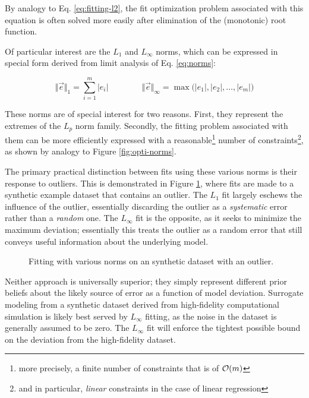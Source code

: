 \noindent
By analogy to Eq. \ref{eq:fitting-l2}, the fit optimization problem associated with this equation is often solved more easily after elimination of the (monotonic) root function.

Of particular interest are the $L_1$ and $L_\infty$ norms, which can be expressed in special form derived from limit analysis of Eq. \ref{eq:norms}:

\begin{equation*}
    \big\Vert \vec{e} \big\Vert _1      = \sum_{i=1}^m |e_i|
    \qquad\qquad
    \big\Vert \vec{e} \big\Vert _\infty = \max\big(|e_1|, |e_2|, \dots, |e_m|\big)
\end{equation*}

\noindent
These norms are of special interest for two reasons. First, they represent the extremes of the $L_p$ norm family. Secondly, the fitting problem associated with them can be more efficiently expressed with a reasonable\footnote{more precisely, a finite number of constraints that is of $\mathcal{O}(m)$} number of constraints\footnote{and in particular, \textit{linear} constraints in the case of linear regression}, as shown by analogy to Figure \ref{fig:opti-norms}.

The primary practical distinction between fits using these various norms is their response to outliers. This is demonstrated in Figure \ref{fig:fitting-norm}, where fits are made to a synthetic example dataset that contains an outlier. The $L_1$ fit largely eschews the influence of the outlier, essentially discarding the outlier as a \textit{systematic} error rather than a \textit{random} one. The $L_\infty$ fit is the opposite, as it seeks to minimize the maximum deviation; essentially this treats the outlier as a random error that still conveys useful information about the underlying model.

\begin{figure}[H]
    \centering
%    
    \ifdraft{}{}
    \caption{Fitting with various norms on an synthetic dataset with an outlier.}
    \label{fig:fitting-norm}
\end{figure}

Neither approach is universally superior; they simply represent different prior beliefs about the likely source of error as a function of model deviation. Surrogate modeling from a synthetic dataset derived from high-fidelity computational simulation is likely best served by $L_\infty$ fitting, as the noise in the dataset is generally assumed to be zero. The $L_\infty$ fit will enforce the tightest possible bound on the deviation from the high-fidelity dataset.

